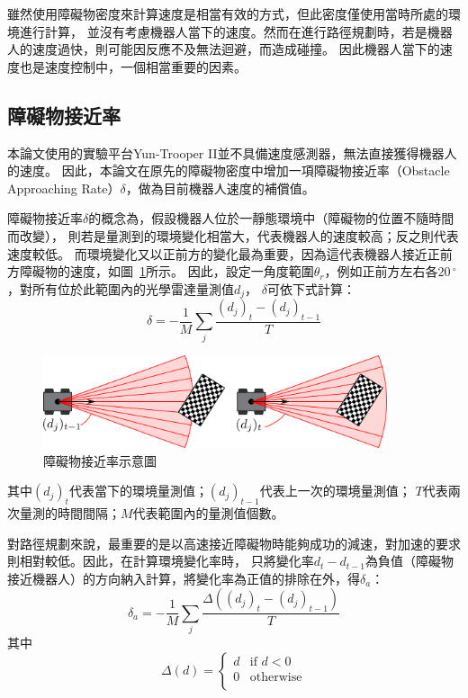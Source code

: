 雖然使用障礙物密度來計算速度是相當有效的方式，但此密度僅使用當時所處的環境進行計算，
並沒有考慮機器人當下的速度。然而在進行路徑規劃時，若是機器人的速度過快，則可能因反應不及無法迴避，而造成碰撞。
因此機器人當下的速度也是速度控制中，一個相當重要的因素。

\subsection{障礙物接近率}
本論文使用的實驗平台Yun-Trooper II並不具備速度感測器，無法直接獲得機器人的速度。
因此，本論文在原先的障礙物密度中增加一項障礙物接近率（Obstacle Approaching Rate）$\delta$，做為目前機器人速度的補償值。

障礙物接近率$\delta$的概念為，假設機器人位於一靜態環境中（障礙物的位置不隨時間而改變），
則若是量測到的環境變化相當大，代表機器人的速度較高；反之則代表速度較低。
而環境變化又以正前方的變化最為重要，因為這代表機器人接近正前方障礙物的速度，如圖~\ref{f:OAR}所示。
因此，設定一角度範圍$\theta_r$，例如正前方左右各$20\,^{\circ}$，對所有位於此範圍內的光學雷達量測值$d_j$，
$\delta$可依下式計算：
\begin{equation}
	\delta = -\frac{1}{M}\sum_{j}\frac{(d_j)_t - (d_j)_{t-1}}{T}
\end{equation}
\begin{figure}[h!]
	\centering
	\includegraphics[width=0.9\textwidth]{figures/algorithm/obstacle_approaching_rate}
	\caption{障礙物接近率示意圖}
	\label{f:OAR}
\end{figure}
其中$(d_j)_t$代表當下的環境量測值；$(d_j)_{t-1}$代表上一次的環境量測值；
$T$代表兩次量測的時間間隔；$M$代表範圍內的量測值個數。

對路徑規劃來說，最重要的是以高速接近障礙物時能夠成功的減速，對加速的要求則相對較低。因此，在計算環境變化率時，
只將變化率$d_t - d_{t-1}$為負值（障礙物接近機器人）的方向納入計算，將變化率為正值的排除在外，得$\delta_a$：
\begin{equation}
	\delta_a = -\frac{1}{M}\sum_{j}\frac{\Delta((d_j)_t - (d_j)_{t-1})}{T}
\end{equation}
其中
\begin{equation*}
	\Delta(d) = 
	\begin{cases}
		d	& \textrm{if } d < 0 \\
		0	& \textrm{otherwise} \\
	\end{cases}
\end{equation*}

